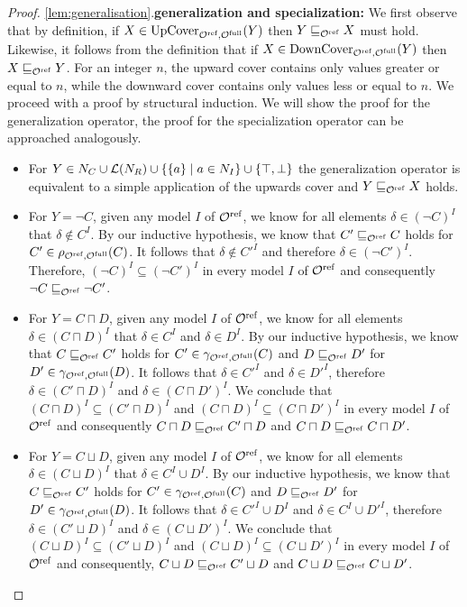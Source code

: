 \begin{proof}
  \item \ref{lem:generalisation}.\enspace \textbf{generalization and specialization:\enspace}
  We first observe that by definition, if $X \in {\ensuremath{\operatorname{UpCover}}}_{{\mathcal{O}^\textnormal{ref}},{\mathcal{O}^\textnormal{full}}}(Y)$ then $Y \sqsubseteq_{\mathcal{O}^\textnormal{ref}} X$ must hold. Likewise, it follows from the definition that if $X \in {\ensuremath{\operatorname{DownCover}}}_{{\mathcal{O}^\textnormal{ref}},{\mathcal{O}^\textnormal{full}}}(Y)$ then $X \sqsubseteq_{\mathcal{O}^\textnormal{ref}} Y$. For an integer $n$, the upward cover contains only values greater or equal to $n$, while the downward cover contains only values less or equal to $n$. We proceed with a proof by structural induction. We will show the proof for the generalization operator, the proof for the specialization operator can be approached analogously.
  \begin{itemize}
    \item For $Y \in N_C \cup \mathcal{L}(N_R) \cup \{ \{a\} \mid a \in N_I \} \cup \{ \top, \bot \}$ the generalization operator is equivalent to a simple application of the upwards cover and $Y \sqsubseteq_{\mathcal{O}^\textnormal{ref}} X$ holds.
    \item For $Y = \lnot C$, given any model $I$ of ${\mathcal{O}^\textnormal{ref}}$, we know for all elements $\delta \in (\lnot C)^I$ that $\delta \not\in C^I$. By our inductive hypothesis, we know that $C' \sqsubseteq_{\mathcal{O}^\textnormal{ref}} C$ holds for $C' \in \rho_{{\mathcal{O}^\textnormal{ref}},{\mathcal{O}^\textnormal{full}}}(C)$. It follows that $\delta \not\in C'^I$ and therefore $\delta \in (\lnot C')^I$. Therefore, $(\lnot C)^I \subseteq (\lnot C')^I$ in every model $I$ of ${\mathcal{O}^\textnormal{ref}}$ and consequently $\lnot C \sqsubseteq_{\mathcal{O}^\textnormal{ref}} \lnot C'$.
    \item For $Y = C \sqcap D$, given any model $I$ of ${\mathcal{O}^\textnormal{ref}}$, we know for all elements $\delta \in (C \sqcap D)^I$ that $\delta \in C^I$ and $\delta \in D^I$. By our inductive hypothesis, we know that $C \sqsubseteq_{\mathcal{O}^\textnormal{ref}} C'$ holds for $C' \in \gamma_{{\mathcal{O}^\textnormal{ref}},{\mathcal{O}^\textnormal{full}}}(C)$ and $D \sqsubseteq_{\mathcal{O}^\textnormal{ref}} D'$ for $D' \in \gamma_{{\mathcal{O}^\textnormal{ref}},{\mathcal{O}^\textnormal{full}}}(D)$. It follows that $\delta \in C'^I$ and $\delta \in D'^I$, therefore $\delta \in (C' \sqcap D)^I$ and $\delta \in (C \sqcap D')^I$. We conclude that $(C \sqcap D)^I \subseteq (C' \sqcap D)^I$ and $(C \sqcap D)^I \subseteq (C \sqcap D')^I$ in every model $I$ of ${\mathcal{O}^\textnormal{ref}}$ and consequently $C \sqcap D \sqsubseteq_{\mathcal{O}^\textnormal{ref}} C' \sqcap D$ and $C \sqcap D \sqsubseteq_{\mathcal{O}^\textnormal{ref}} C \sqcap D'$.
    \item For $Y = C \sqcup D$, given any model $I$ of ${\mathcal{O}^\textnormal{ref}}$, we know for all elements $\delta \in (C \sqcup D)^I$ that $\delta \in C^I \cup D^I$. By our inductive hypothesis, we know that $C \sqsubseteq_{\mathcal{O}^\textnormal{ref}} C'$ holds for $C' \in \gamma_{{\mathcal{O}^\textnormal{ref}},{\mathcal{O}^\textnormal{full}}}(C)$ and $D \sqsubseteq_{\mathcal{O}^\textnormal{ref}} D'$ for $D' \in \gamma_{{\mathcal{O}^\textnormal{ref}},{\mathcal{O}^\textnormal{full}}}(D)$. It follows that $\delta \in C'^I \cup D^I$ and $\delta \in C^I \cup D'^I$, therefore $\delta \in (C' \sqcup D)^I$ and $\delta \in (C \sqcup D')^I$. We conclude that $(C \sqcup D)^I \subseteq (C' \sqcup D)^I$ and $(C \sqcup D)^I \subseteq (C \sqcup D')^I$ in every model $I$ of ${\mathcal{O}^\textnormal{ref}}$ and consequently, $C \sqcup D \sqsubseteq_{\mathcal{O}^\textnormal{ref}} C' \sqcup D$ and $C \sqcup D \sqsubseteq_{\mathcal{O}^\textnormal{ref}} C \sqcup D'$.

\end{itemize}
\end{proof}
